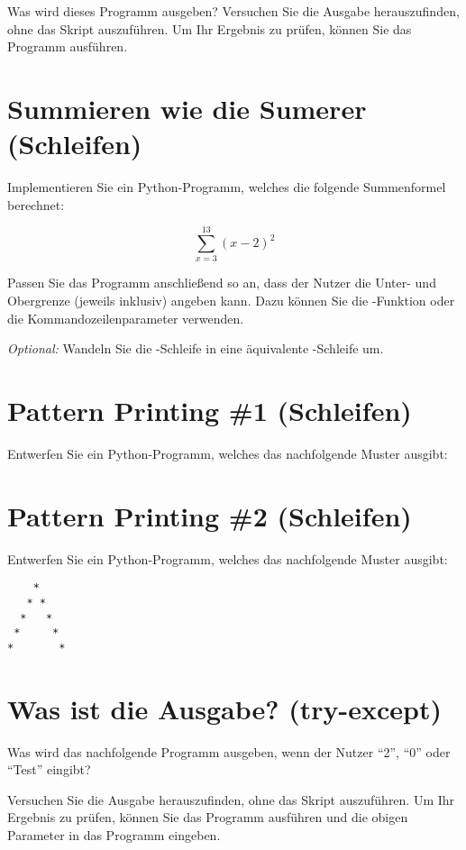 Was wird dieses Programm ausgeben? Versuchen Sie die Ausgabe herauszufinden, ohne das Skript auszuführen. Um Ihr Ergebnis zu prüfen, können Sie das Programm  ausführen.


\section{Summieren wie die Sumerer \small{(Schleifen)}}

Implementieren Sie ein Python-Programm, welches die folgende Summenformel berechnet:

$$\sum_{x=3}^{13}(x-2)^2$$

Passen Sie das Programm anschließend so an, dass der Nutzer die Unter- und Obergrenze (jeweils inklusiv) angeben kann. Dazu können Sie die -Funktion oder die Kommandozeilenparameter verwenden. 

\textit{Optional:} Wandeln Sie die -Schleife in eine äquivalente -Schleife um.



\section{Pattern Printing \#1 \small{(Schleifen)}}

Entwerfen Sie ein Python-Programm, welches das nachfolgende Muster ausgibt: 




\section{Pattern Printing \#2 \small{(Schleifen)}}

Entwerfen Sie ein Python-Programm, welches das nachfolgende Muster ausgibt: 

\begin{lstlisting}
    *
   * *
  *   *
 *     *
*       *
\end{lstlisting}



\section{Was ist die Ausgabe? \small{(try-except)}}

Was wird das nachfolgende Programm ausgeben, wenn der Nutzer "`2"', "`0"' oder "`Test"' eingibt?

 Versuchen Sie die Ausgabe herauszufinden, ohne das Skript auszuführen. Um Ihr Ergebnis zu prüfen, können Sie das Programm  ausführen und die obigen Parameter in das Programm eingeben.




